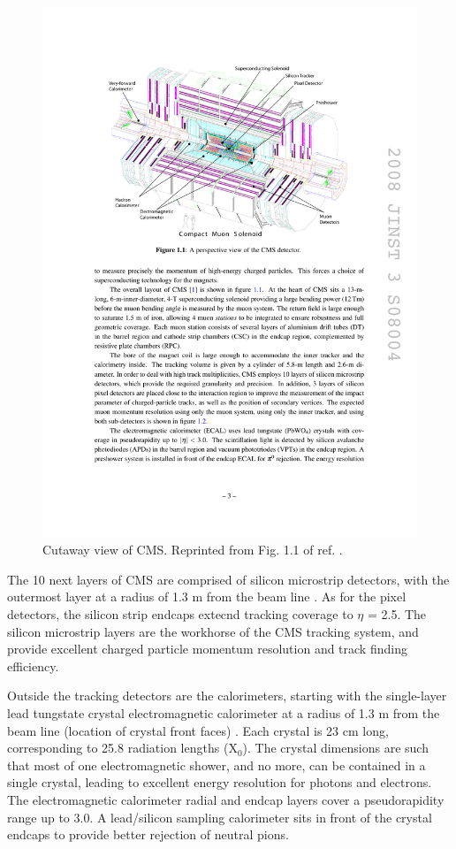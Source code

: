 \documentclass[dissertation.tex]{subfiles}
\begin{document}
\begin{figure}
	\centering
	\includegraphics[scale=1.0]{CMS_cutaway}
	\caption{Cutaway view of CMS.  Reprinted from Fig. 1.1 of ref. \cite{CMS_detector_paper}.}
	\label{fig:CMS_cutaway}
\end{figure}

The 10 next layers of CMS are comprised of silicon microstrip detectors, with the outermost layer at a radius of 1.3 m from the beam line \cite{CMS_detector_paper}.  As for the pixel detectors, the silicon strip endcaps extecnd tracking coverage to $\eta$ = 2.5.  The silicon microstrip layers are the workhorse of the CMS tracking system, and provide excellent charged particle momentum resolution and track finding efficiency.

Outside the tracking detectors are the calorimeters, starting with the single-layer lead tungstate crystal electromagnetic calorimeter at a radius of 1.3 m from the beam line (location of crystal front faces) \cite{CMS_detector_paper}.  Each crystal is 23 cm long, corresponding to 25.8 radiation lengths ($\mbox{X}_{0}$).  The crystal dimensions are such that most of one electromagnetic shower, and no more, can be contained in a single crystal, leading to excellent energy resolution for photons and electrons.  The electromagnetic calorimeter radial and endcap layers cover a pseudorapidity range up to 3.0.  A lead/silicon sampling calorimeter sits in front of the crystal endcaps to provide better rejection of neutral pions.
\end{document}
